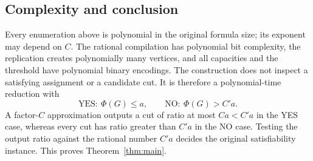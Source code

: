 \subsection{Complexity and conclusion}

Every enumeration above is polynomial in the original formula size; its
exponent may depend on $C$.  The rational compilation has polynomial bit
complexity, the replication creates polynomially many vertices, and all
capacities and the threshold have polynomial binary encodings.  The
construction does not inspect a satisfying assignment or a candidate cut.
It is therefore a polynomial-time reduction with
\[
 \text{YES}:\ \Phi(G)\le a,
 \qquad
 \text{NO}:\ \Phi(G)>C'a.
\]
A factor-$C$ approximation outputs a cut of ratio at most $Ca<C'a$ in the
YES case, whereas every cut has ratio greater than $C'a$ in the NO case.
Testing the output ratio against the rational number $C'a$ decides the
original satisfiability instance.  This proves Theorem~\ref{thm:main}.
